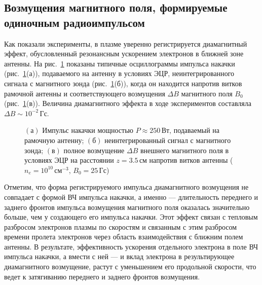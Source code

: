 \documentclass[10pt]{disser}
\begin{document}
\subsection{Возмущения магнитного поля, формируемые одиночным радиоимпульсом}
Как показали эксперименты, в плазме уверенно регистрируется диамагнитный эффект, обусловленный резонансным ускорением электронов в ближней зоне антенны. На \mbox{рис.~\ref{fig:pump}} показаны типичные осциллограммы импульса накачки (\mbox{рис.~\ref{fig:pump}}(а)), подаваемого на антенну в условиях ЭЦР, неинтегрированного сигнала с магнитного зонда (\mbox{рис.~\ref{fig:pump}}(б)),  когда он находится напротив витков рамочной антенны  и соответствующего возмущения $\Delta{}B$ магнитного поля $B_{0}$ (\mbox{рис.~\ref{fig:pump}}(в)). Величина диамагнитного эффекта в ходе экспериментов составляла $\Delta{}B\sim{}10^{-2}$\,Гс.
\begin{figure}[H]
  \centering
  \def\svgwidth{0.6\columnwidth} %
  
  \caption{$(а)$ Импульс накачки мощностью $P\approx{}250$\,Вт, подаваемый на рамочную антенну; $(б)$ неинтегрированный сигнал с магнитного зонда; $(в)$ полное возмущение $\Delta{}B$ внешнего магнитного поля в условиях ЭЦР на расстоянии $z=3.5$\,см напротив витков антенны ($n_{e}=10^{10}$\,см$^{-3}$, $B_{0} = 25$\,Гс)}
  \label{fig:pump}
\end{figure}

Отметим, что форма регистрируемого импульса диамагнитного возмущения не совпадает с формой ВЧ импульса накачки, а именно --- длительность переднего и заднего фронтов импульса возмущения магнитного поля  оказалась значительно больше, чем у создающего его импульса накачки.  Этот эффект связан с тепловым разбросом электронов плазмы по скоростям и связанным с этим разбросом времени пролета электронов через область взаимодействия с ближним полем антенны. В результате, эффективность ускорения отдельного электрона в поле ВЧ импульса накачки, а вмести с ней --- и вклад электрона в результирующее диамагнитного возмущение, растут с уменьшением его продольной скорости, что ведет к затягиванию переднего и заднего фронтов возмущения. 
\end{document}
